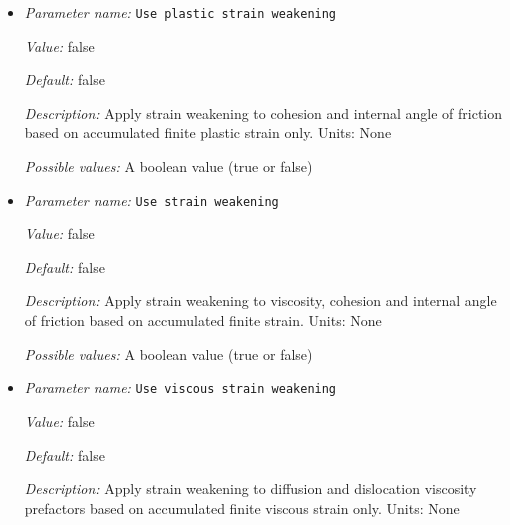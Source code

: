 \begin{itemize}
{\it Default:} false


{\it Description:} Track and use the full finite strain tensor for strain weakening. Units: None


{\it Possible values:} A boolean value (true or false)
\item {\it Parameter name:} {\tt Use plastic strain weakening}
\label{parameters:Material model/Visco Plastic/Use plastic strain weakening}
\label{parameters:Material_20model/Visco_20Plastic/Use_20plastic_20strain_20weakening}


{\it Value:} false


{\it Default:} false


{\it Description:} Apply strain weakening to cohesion and internal angle of friction based on accumulated finite plastic strain only.  Units: None


{\it Possible values:} A boolean value (true or false)
\item {\it Parameter name:} {\tt Use strain weakening}
\label{parameters:Material model/Visco Plastic/Use strain weakening}
\label{parameters:Material_20model/Visco_20Plastic/Use_20strain_20weakening}


{\it Value:} false


{\it Default:} false


{\it Description:} Apply strain weakening to viscosity, cohesion and internal angle of friction based on accumulated finite strain.  Units: None


{\it Possible values:} A boolean value (true or false)
\item {\it Parameter name:} {\tt Use viscous strain weakening}
\label{parameters:Material model/Visco Plastic/Use viscous strain weakening}
\label{parameters:Material_20model/Visco_20Plastic/Use_20viscous_20strain_20weakening}


{\it Value:} false


{\it Default:} false


{\it Description:} Apply strain weakening to diffusion and dislocation viscosity prefactors based on accumulated finite viscous strain only.  Units: None



\end{itemize}
